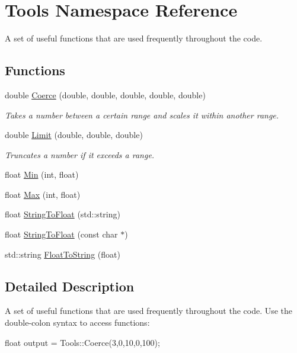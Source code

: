 \hypertarget{namespace_tools}{\section{\-Tools \-Namespace \-Reference}
\label{namespace_tools}
}


\-A set of useful functions that are used frequently throughout the code.  


\subsection*{\-Functions}
\begin{DoxyCompactItemize}
\item 
double \hyperlink{namespace_tools_a7f4eaf8719ea333f45be6f9cda129692}{\-Coerce} (double, double, double, double, double)
\begin{DoxyCompactList}\small\item\em \-Takes a number between a certain range and scales it within another range. \end{DoxyCompactList}\item 
double \hyperlink{namespace_tools_a5d6a33077b2adc9c5d8a780cb8b5dce4}{\-Limit} (double, double, double)
\begin{DoxyCompactList}\small\item\em \-Truncates a number if it exceeds a range. \end{DoxyCompactList}\item 
float \hyperlink{namespace_tools_a59f610366d977fa2f6e9ff5062b993cd}{\-Min} (int, float)
\item 
float \hyperlink{namespace_tools_a583529894f4b75e3a13b69d21e731bb2}{\-Max} (int, float)
\item 
float \hyperlink{namespace_tools_a2b0885705a90e217a3a21e785086a22b}{\-String\-To\-Float} (std\-::string)
\item 
float \hyperlink{namespace_tools_a34027c1730a6a0e3ce9934594612e91e}{\-String\-To\-Float} (const char $\ast$)
\item 
std\-::string \hyperlink{namespace_tools_a44e230e5622af0d230bd90337102d44b}{\-Float\-To\-String} (float)
\end{DoxyCompactItemize}


\subsection{\-Detailed \-Description}
\-A set of useful functions that are used frequently throughout the code. \-Use the double-\/colon syntax to access functions\-: 
\begin{DoxyCode}
 float output = Tools::Coerce(3,0,10,0,100);
\end{DoxyCode}
 

